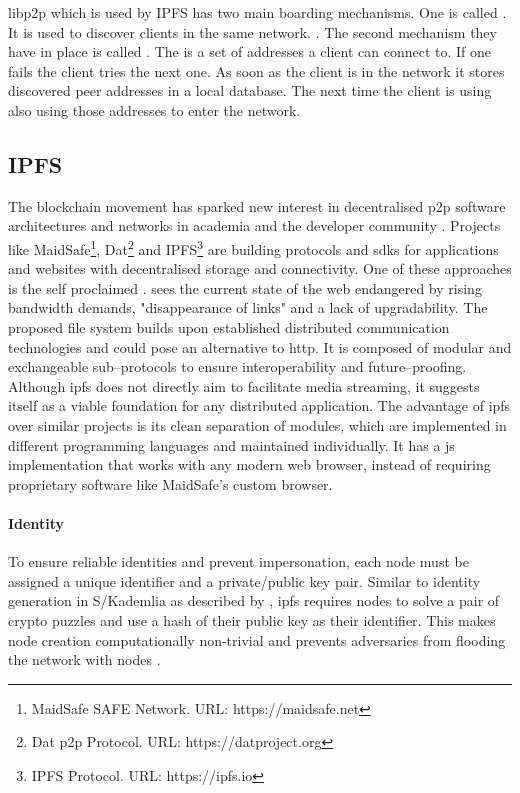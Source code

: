 libp2p which is used by IPFS has two main boarding mechanisms. One is called . It is used to discover clients in the same network. \cite{ipfs-bootstrapping}.
The second mechanism they have in place is called . The  is a set of addresses a client can connect to. If one fails the client tries the next one. As soon as the client is in the network it stores discovered peer addresses in a local database. The next time the client is using also using those addresses to enter the network.

\subsection{IPFS}\label{sec:IPFS}

The blockchain movement has sparked new interest in decentralised \gls{p2p} software architectures and networks in academia and the developer community \cite{medium-dnets}. Projects like MaidSafe\footnote{MaidSafe SAFE Network. URL: {https://maidsafe.net}}, Dat\footnote{Dat \gls{p2p} Protocol. URL: {https://datproject.org}} and IPFS\footnote{\label{ipfs}IPFS Protocol. URL: {https://ipfs.io}} are building protocols and \glspl{sdk} for applications and websites with decentralised storage and connectivity. One of these approaches is the self proclaimed . \citet[\S1]{ipfs-whitepaper} sees the current state of the web endangered by rising bandwidth demands, "disappearance of links" and a lack of upgradability. The proposed file system builds upon established distributed communication technologies and could pose an alternative to \gls{http}. It is composed of modular and exchangeable sub–protocols to ensure interoperability and future–proofing. Although \gls{ipfs} does not directly aim to facilitate media streaming, it suggests itself as a viable foundation for any distributed application. The advantage of \gls{ipfs} over similar projects is its clean separation of modules, which are implemented in different programming languages and maintained individually. It has a \gls{js} implementation that works with any modern web browser, instead of requiring proprietary software like MaidSafe's custom browser.

\paragraph{Identity}
To ensure reliable identities and prevent impersonation, each node must be assigned a unique identifier and a private/public key pair. Similar to identity generation in S/Kademlia as described by \citet[\S4.1]{s_kademlia}, \gls{ipfs} requires nodes to solve a pair of crypto puzzles and use a hash of their public key as their identifier. This makes node creation computationally non-trivial and prevents adversaries from flooding the network with nodes \cite[\S3.2]{s_kademlia}.

